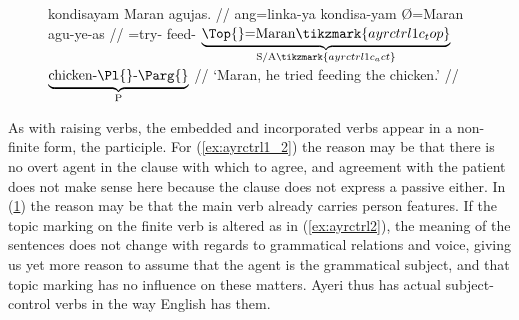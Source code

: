 \begin{figure}
\a\label{ex:ayrctrl1_3}\begingl[aboveglcskip=1.5em,] %
	 kondisayam Maran agujas. //
	\glb ang=linka-ya kondisa-yam Ø=Maran agu-ye-as //
	\glc \AgtT{}=try-\TsgM{}%
		feed-\Ptcp{}
		$\underbrace{\text{\Top{}=Maran}%
			\tikzmark{ayrctrl1c_top}%
		}_{\text{S/A}%
			\tikzmark{ayrctrl1c_act}%
		}$
		$\underbrace{\text{chicken-\Pl{}-\Parg{}}}_{\text{P}}$
		//
	\glft `Maran, he tried feeding the chicken.' //
\endgl
{}

\xe
\end{figure}

As with raising verbs, the embedded and incorporated verbs appear in a
non-finite form, the participle. For (\ref{ex:ayrctrl1_2}) the reason may be
that there is no overt agent in the clause with which to agree, and agreement
with the patient does not make sense here because the clause does not express a
passive either. In (\ref{ex:ayrctrl1_3}) the reason may be that the main verb
already carries person features. If the topic marking on the finite verb is
altered as in (\ref{ex:ayrctrl2}), the meaning of the sentences does not change
with regards to grammatical relations and voice, giving us yet more reason to
assume that the agent is the grammatical subject, and that topic marking has no
influence on these matters. Ayeri thus has actual subject-control verbs in the
way English has them.

